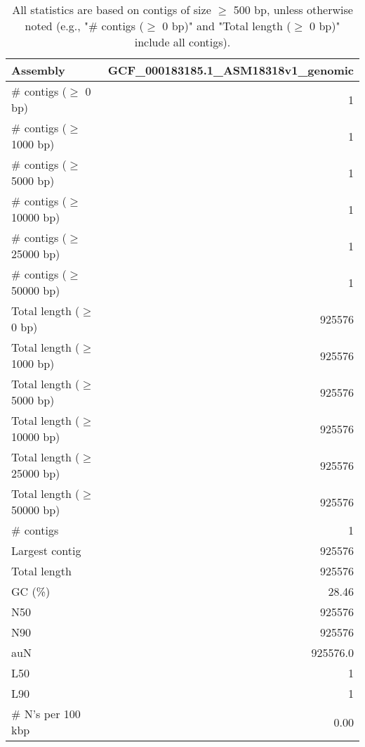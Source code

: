 \documentclass[12pt,a4paper]{article}
\begin{document}
\begin{table}[ht]
\begin{center}
\caption{All statistics are based on contigs of size $\geq$ 500 bp, unless otherwise noted (e.g., "\# contigs ($\geq$ 0 bp)" and "Total length ($\geq$ 0 bp)" include all contigs).}
\begin{tabular}{|l*{1}{|r}|}
\hline
Assembly & GCF\_000183185.1\_ASM18318v1\_genomic \\ \hline
\# contigs ($\geq$ 0 bp) & 1 \\ \hline
\# contigs ($\geq$ 1000 bp) & 1 \\ \hline
\# contigs ($\geq$ 5000 bp) & 1 \\ \hline
\# contigs ($\geq$ 10000 bp) & 1 \\ \hline
\# contigs ($\geq$ 25000 bp) & 1 \\ \hline
\# contigs ($\geq$ 50000 bp) & 1 \\ \hline
Total length ($\geq$ 0 bp) & 925576 \\ \hline
Total length ($\geq$ 1000 bp) & 925576 \\ \hline
Total length ($\geq$ 5000 bp) & 925576 \\ \hline
Total length ($\geq$ 10000 bp) & 925576 \\ \hline
Total length ($\geq$ 25000 bp) & 925576 \\ \hline
Total length ($\geq$ 50000 bp) & 925576 \\ \hline
\# contigs & 1 \\ \hline
Largest contig & 925576 \\ \hline
Total length & 925576 \\ \hline
GC (\%) & 28.46 \\ \hline
N50 & 925576 \\ \hline
N90 & 925576 \\ \hline
auN & 925576.0 \\ \hline
L50 & 1 \\ \hline
L90 & 1 \\ \hline
\# N's per 100 kbp & 0.00 \\ \hline
\end{tabular}
\end{center}
\end{table}
\end{document}

